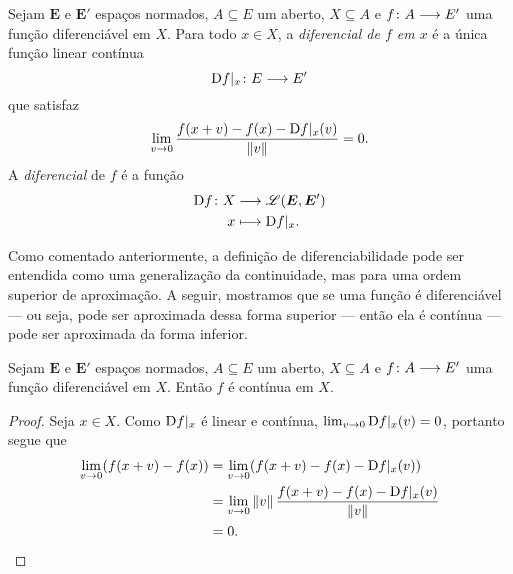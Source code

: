 \begin{definition}[Diferencial]
Sejam $\bm E$ e $\bm E'$ espaços normados, $A \subseteq E$ um aberto, $X \subseteq A$ e $f\colon \allowbreak A \longrightarrow E'$ uma função diferenciável em $X$. Para todo $x \in X$, a \emph{diferencial de $f$ em $x$} é a única função linear contínua
	\begin{equation*}
	\mathrm{D} f|_x\colon \allowbreak E \longrightarrow E'
	\end{equation*}
que satisfaz
	\begin{equation*}
	\lim_{v \to 0} \frac{f(x+v) - f(x) - \mathrm{D} f|_x(v)}{\left\Vert{v}\right\Vert} = 0.
	\end{equation*}
A \emph{diferencial} de $f$ é a função
	\begin{align*}
	{\mathrm{D}f}\colon {X} &\longrightarrow {\mathscr{L}(\bm E, \bm E')} \\{x} &\longmapsto \mathrm{D} f|_x.
	\end{align*}
\end{definition}

Como comentado anteriormente, a definição de diferenciabilidade pode ser entendida como uma generalização da continuidade, mas para uma ordem superior de aproximação. A seguir, mostramos que se uma função é diferenciável --- ou seja, pode ser aproximada dessa forma superior --- então ela é contínua ---pode ser aproximada da forma inferior.

\begin{proposition}
Sejam $\bm E$ e $\bm E'$ espaços normados, $A \subseteq E$ um aberto, $X \subseteq A$ e $f\colon \allowbreak A \longrightarrow E'$ uma função diferenciável em $X$. Então $f$ é contínua em $X$.
\end{proposition}
\begin{proof}
Seja $x \in X$. Como $\mathrm{D} f|_x$ é linear e contínua, $\lim_{v \to 0} \mathrm{D} f|_x(v) = 0$, portanto segue que
	\begin{align*}
	\lim_{v \to 0} (f(x+v) - f(x)) &= \lim_{v \to 0} (f(x+v) - f(x) - \mathrm{D} f|_x(v)) \\
		&= \lim_{v \to 0} \left\Vert{v}\right\Vert\frac{f(x+v) - f(x) - \mathrm{D} f|_x(v)}{\left\Vert{v}\right\Vert} \\
		&= 0.
	\qedhere
	\end{align*}
\end{proof}

